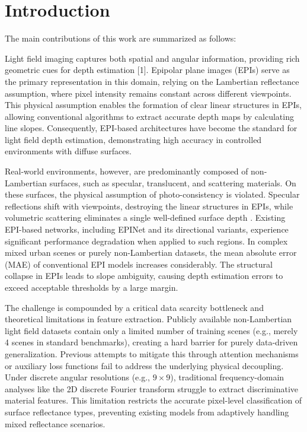 \section{Introduction}

The main contributions of this work are summarized as follows:

Light field imaging captures both spatial and angular information, providing rich geometric cues for depth estimation [1]. Epipolar plane images (EPIs) serve as the primary representation in this domain, relying on the Lambertian reflectance assumption, where pixel intensity remains constant across different viewpoints. This physical assumption enables the formation of clear linear structures in EPIs, allowing conventional algorithms to extract accurate depth maps by calculating line slopes. Consequently, EPI-based architectures have become the standard for light field depth estimation, demonstrating high accuracy in controlled environments with diffuse surfaces.

Real-world environments, however, are predominantly composed of non-Lambertian surfaces, such as specular, translucent, and scattering materials. On these surfaces, the physical assumption of photo-consistency is violated. Specular reflections shift with viewpoints, destroying the linear structures in EPIs, while volumetric scattering eliminates a single well-defined surface depth . Existing EPI-based networks, including EPINet and its directional variants, experience significant performance degradation when applied to such regions. In complex mixed urban scenes or purely non-Lambertian datasets, the mean absolute error (MAE) of conventional EPI models increases considerably. The structural collapse in EPIs leads to slope ambiguity, causing depth estimation errors to exceed acceptable thresholds by a large margin.

The challenge is compounded by a critical data scarcity bottleneck and theoretical limitations in feature extraction. Publicly available non-Lambertian light field datasets contain only a limited number of training scenes (e.g., merely 4 scenes in standard benchmarks), creating a hard barrier for purely data-driven generalization. Previous attempts to mitigate this through attention mechanisms or auxiliary loss functions fail to address the underlying physical decoupling. Under discrete angular resolutions (e.g., $9 \times 9$), traditional frequency-domain analyses like the 2D discrete Fourier transform struggle to extract discriminative material features. This limitation restricts the accurate pixel-level classification of surface reflectance types, preventing existing models from adaptively handling mixed reflectance scenarios.

